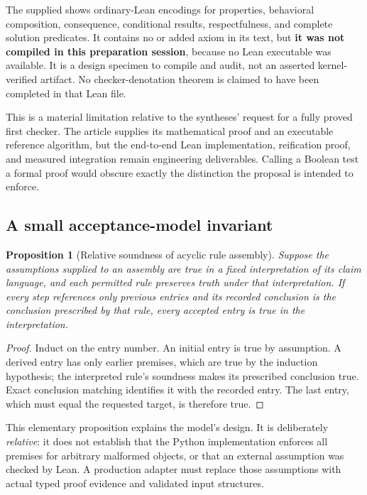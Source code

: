 \documentclass[11pt,letterpaper]{article}
\newcommand{\code}[1]{\texttt{\detokenize{#1}}}
\newtheorem{proposition}[theorem]{Proposition}
\theoremstyle{definition}
\theoremstyle{remark}
\begin{document}
The supplied \code{GneissCore.lean} shows ordinary-Lean encodings for properties,
behavioral composition, consequence, conditional results, respectfulness, and
complete solution predicates. It contains no \code{sorry} or added axiom in its
text, but \textbf{it was not compiled in this preparation session}, because no
Lean executable was available. It is a design specimen to compile and audit,
not an asserted kernel-verified artifact. No checker-denotation theorem is
claimed to have been completed in that Lean file.

This is a material limitation relative to the syntheses' request for a fully
proved first checker. The article supplies its mathematical proof and an
executable reference algorithm, but the end-to-end Lean implementation,
reification proof, and measured integration remain engineering deliverables.
Calling a Boolean test a formal proof would obscure exactly the distinction
the proposal is intended to enforce.

\subsection{A small acceptance-model invariant}
\begin{proposition}[Relative soundness of acyclic rule assembly]
Suppose the assumptions supplied to an assembly are true in a fixed
interpretation of its claim language, and each permitted rule preserves truth
under that interpretation. If every step references only previous entries and
its recorded conclusion is the conclusion prescribed by that rule, every
accepted entry is true in the interpretation.
\end{proposition}
\begin{proof}
Induct on the entry number. An initial entry is true by assumption. A derived
entry has only earlier premises, which are true by the induction hypothesis;
the interpreted rule's soundness makes its prescribed conclusion true. Exact
conclusion matching identifies it with the recorded entry. The last entry,
which must equal the requested target, is therefore true.
\end{proof}
This elementary proposition explains the model's design. It is deliberately
\emph{relative}: it does not establish that the Python implementation enforces
all premises for arbitrary malformed objects, or that an external assumption
was checked by Lean. A production adapter must replace those assumptions with
actual typed proof evidence and validated input structures.
\end{document}
